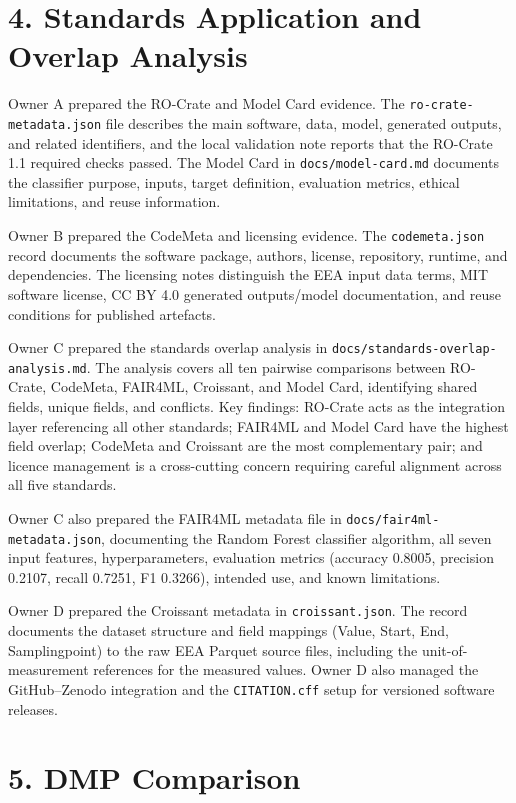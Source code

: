 \documentclass[10pt,a4paper]{article}
\begin{document}
\section*{4. Standards Application and Overlap Analysis}
Owner A prepared the RO-Crate and Model Card evidence. The
\texttt{ro-crate-metadata.json} file describes the main software, data, model,
generated outputs, and related identifiers, and the local validation note reports
that the RO-Crate 1.1 required checks passed. The Model Card in
\texttt{docs/model-card.md} documents the classifier purpose, inputs, target
definition, evaluation metrics, ethical limitations, and reuse information.

Owner B prepared the CodeMeta and licensing evidence. The \texttt{codemeta.json}
record documents the software package, authors, license, repository, runtime, and
dependencies. The licensing notes distinguish the EEA input data terms, MIT
software license, CC BY 4.0 generated outputs/model documentation, and reuse
conditions for published artefacts.

Owner C prepared the standards overlap analysis in
\texttt{docs/standards-overlap-analysis.md}. The analysis covers all ten pairwise
comparisons between RO-Crate, CodeMeta, FAIR4ML, Croissant, and Model Card,
identifying shared fields, unique fields, and conflicts. Key findings: RO-Crate
acts as the integration layer referencing all other standards; FAIR4ML and Model
Card have the highest field overlap; CodeMeta and Croissant are the most
complementary pair; and licence management is a cross-cutting concern requiring
careful alignment across all five standards.

Owner C also prepared the FAIR4ML metadata file in
\texttt{docs/fair4ml-metadata.json}, documenting the Random Forest classifier
algorithm, all seven input features, hyperparameters, evaluation metrics
(accuracy 0.8005, precision 0.2107, recall 0.7251, F1 0.3266), intended use, and
known limitations.

Owner D prepared the Croissant metadata in \texttt{croissant.json}. The record
documents the dataset structure and field mappings (Value, Start, End,
Samplingpoint) to the raw EEA Parquet source files, including the unit-of-measurement
references for the measured values. Owner D also managed the GitHub--Zenodo integration and the \texttt{CITATION.cff} setup for versioned software releases.

\section*{5. DMP Comparison}
\end{document}
